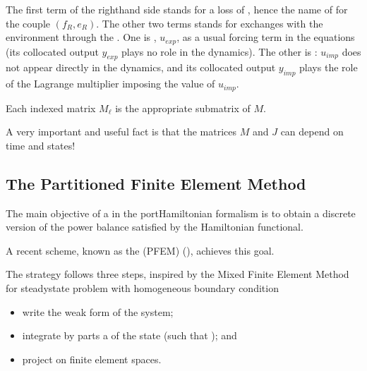 \documentclass[letterpaper,10pt,english]{sphinxmanual}
\begin{document}
\sphinxAtStartPar
The first term of the right\sphinxhyphen{}hand side stands for a loss of , hence the name of  for the couple \((f_R,e_R)\). The other two terms stands for exchanges with the environment through the . One is , \(u_{exp}\), as a usual forcing term in the equations (its collocated output \(y_{exp}\) plays no role in the dynamics). The other is : \(u_{imp}\) does not appear directly in the dynamics, and its collocated output \(y_{imp}\) plays the role of the Lagrange multiplier imposing the value of \(u_{imp}\).

\sphinxAtStartPar
Each indexed matrix \(M_\ell\) is the appropriate sub\sphinxhyphen{}matrix of \(M\).

\sphinxAtStartPar
A very important and useful fact is that the matrices \(M\) and \(J\) can depend on time and states!


\subsection{The Partitioned Finite Element Method}
\label{\detokenize{index:the-partitioned-finite-element-method}}
\sphinxAtStartPar
The main objective of a  in the port\sphinxhyphen{}Hamiltonian formalism is to obtain a discrete version of the power balance satisfied by the Hamiltonian functional.

\sphinxAtStartPar
A recent scheme, known as the  (PFEM) (), achieves this goal.

\sphinxAtStartPar
The strategy follows three steps, inspired by the Mixed Finite Element Method for steady\sphinxhyphen{}state problem with homogeneous boundary condition
\begin{itemize}
\item {} 
\sphinxAtStartPar
write the weak form of the system;

\item {} 
\sphinxAtStartPar
integrate by parts a  of the state (such that ); and

\item {} 
\sphinxAtStartPar
project on finite element spaces.

\end{itemize}
\end{document}
